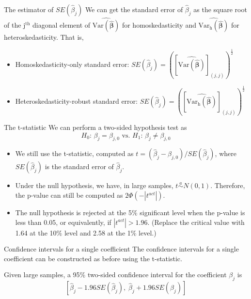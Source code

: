 \documentclass[presentation,10pt]{beamer}
\newcommand{\var}{\mathrm{Var}}
\begin{document}
\begin{frame}[label={sec:org6aedfb2}]{The estimator of \(SE(\hat{\beta}_j)\)}
We can get the standard error of \(\hat{\beta}_j\) as the
square root of the j\(^{\text{th}}\) diagonal element of
\(\widehat{\var(\hat{\boldsymbol{\beta}})}\) for homoskedasticity and
\(\widehat{\var_{\mathrm{h}}(\hat{\boldsymbol{\beta}})}\) for
heteroskedasticity. That is,
\begin{itemize}
\item Homoskedasticity-only standard error: \(SE(\hat{\beta}_j) =
  \left(\left[\widehat{\var(\hat{\boldsymbol{\beta}})}\right]_{(j,j)}\right)^{\frac{1}{2}}\)
\item Heteroskedasticity-robust standard error: \(SE(\hat{\beta}_j) =
  \left(\left[\widehat{\var_{\mathrm{h}}(\hat{\boldsymbol{\beta}})}\right]_{(j,j)}\right)^{\frac{1}{2}}\)
\end{itemize}
\end{frame}

\begin{frame}[label={sec:orgb5bce4e}]{The t-statistic}
We can perform a two-sided hypothesis test as
\[ H_0:\, \beta_j = \beta_{j,0} \text{ vs. } H_1:\, \beta_j \neq
\beta_{j,0} \]

\begin{itemize}
\item We still use the t-statistic, computed as
\(t = (\hat{\beta}_j - \beta_{j,0})/SE(\hat{\beta}_j)\),
where \(SE(\hat{\beta}_j)\) is the standard error of \(\hat{\beta}_j\).

\item Under the null hypothesis, we have, in large samples, \(t \overset{a}{\sim} N(0, 1)\).
Therefore, the p-value can still be computed as \(2\varPhi(-|t^{act}|)\).

\item The null hypothesis is rejected at the 5\% significant level when
the p-value is less than 0.05, or equivalently, if \(|t^{act}| >
  1.96\). (Replace the critical value with 1.64 at the 10\% level and 2.58
at the 1\% level.)
\end{itemize}
\end{frame}

\begin{frame}[label={sec:org612c29c}]{Confidence intervals for a single coefficient}
The confidence intervals for a single coefficient can be constructed
as before using the t-statistic.

\vspace{0.2cm}

Given large samples, a 95\% two-sided confidence interval for the
coefficient \(\beta_j\) is
\[ \left[\hat{\beta}_j - 1.96 SE(\hat{\beta}_j),\; \hat{\beta}_j +
1.96 SE(\hat{\beta}_j)\right] \]
\end{frame}
\end{document}
